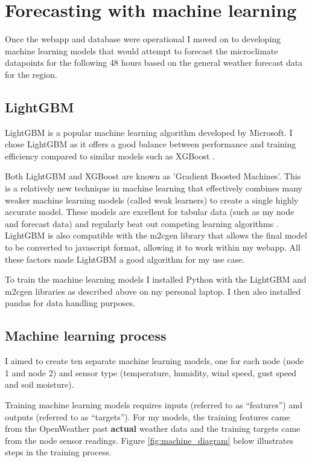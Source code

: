 \section{Forecasting with machine learning}\label{sec:machine-learning}

Once the webapp and database were operational I moved on to developing machine
learning models that would attempt to forecast the microclimate datapoints for
the following 48 hours based on the general weather forecast data for the
region.
\subsection{LightGBM}

LightGBM is a popular machine learning algorithm developed by Microsoft. I chose
LightGBM as it offers a good balance between performance and training efficiency
compared to similar models such as XGBoost \cite{saha2025}.

Both LightGBM and XGBoost are known as 'Gradient Boosted Machines'. This is a
relatively new technique in machine learning that effectively combines many
weaker machine learning models (called weak learners) to create a single highly
accurate model. These models are excellent for tabular data (such as my node and
forecast data) and regularly beat out competing learning algorithms
\cite{tuychiev2023}. LightGBM is also compatible with the m2cgen library that
allows the final model to be converted to javascript format, allowing it to work
within my webapp. All these factors made LightGBM a good algorithm for my use
case.

To train the machine learning models I installed Python with the LightGBM and
m2cgen libraries as described above on my personal laptop. I then also installed
pandas for data handling purposes.

\subsection{Machine learning process}

I aimed to create ten separate machine learning models, one for each node (node
1 and node 2) and sensor type (temperature, humidity, wind speed, gust speed and
soil moisture).

Training machine learning models requires inputs (referred to as “features”) and
outputs (referred to as “targets”).  For my models, the training features came
from the OpenWeather past \textbf{actual} weather data and the training targets
came from the node sensor readings. Figure \ref{fig:machine_diagram} below
illustrates steps in the training process.

